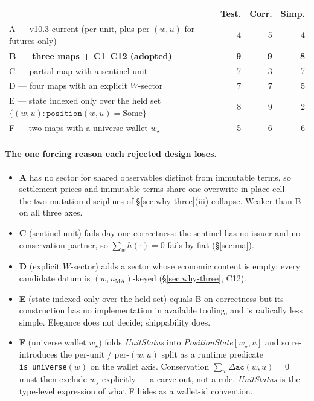 \documentclass[11pt,a4paper]{article}
\begin{document}
\begin{longtable}{p{8.0cm}rrr}
\toprule
 & \textbf{Test.} & \textbf{Corr.} & \textbf{Simp.} \\
\midrule
A --- v10.3 current (per-unit, plus per-$(w,u)$ for futures only) & 4 & 5 & 4 \\
\textbf{B --- three maps + C1--C12 (adopted)} & \textbf{9} & \textbf{9} & \textbf{8} \\
C --- partial map with a sentinel unit & 7 & 3 & 7 \\
D --- four maps with an explicit $W$-sector & 7 & 7 & 5 \\
E --- state indexed only over the held set $\{(w,u): \texttt{position}(w,u)=\mathrm{Some}\}$ & 8 & 9 & 2 \\
F --- two maps with a universe wallet $w_\star$ & 5 & 6 & 6 \\
\bottomrule
\end{longtable}

\paragraph{The one forcing reason each rejected design loses.}
\begin{itemize}[leftmargin=*]
\item \textbf{A} has no sector for shared observables distinct from immutable terms,
so settlement prices and immutable terms share one overwrite-in-place cell --- the two mutation
disciplines of \S\ref{sec:why-three}(iii) collapse. Weaker than B on all three axes.
\item \textbf{C} (sentinel unit) fails day-one correctness: the sentinel has no issuer and
no conservation partner, so $\sum_w h(\cdot)=0$ fails by fiat (\S\ref{sec:ma}).
\item \textbf{D} (explicit $W$-sector) adds a sector whose economic content is empty: every
candidate datum is $(w,u_{\mathrm{MA}})$-keyed (\S\ref{sec:why-three}, C12).
\item \textbf{E} (state indexed only over the held set) equals B on correctness but its
construction has no implementation in available tooling, and is radically less simple.
Elegance does not decide; shippability does.
\item \textbf{F} (universe wallet $w_\star$) folds \emph{UnitStatus} into
\emph{PositionState}$[w_\star,u]$ and so re-introduces the per-unit / per-$(w,u)$ split as a
runtime predicate \texttt{is\_universe}$(w)$ on the wallet axis. Conservation
$\sum_w\Delta\texttt{ac}(w,u)=0$ must then exclude $w_\star$ explicitly --- a carve-out, not
a rule. \emph{UnitStatus} is the type-level expression of what F hides as a wallet-id
convention.
\end{itemize}
\end{document}

